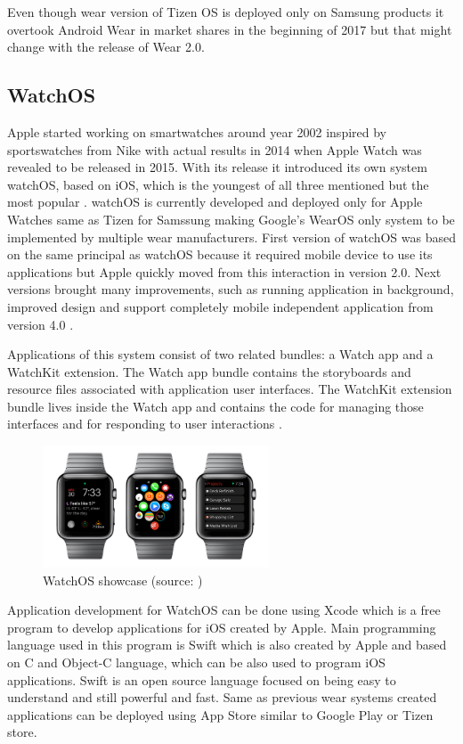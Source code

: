 Even though wear version of Tizen OS is deployed only on Samsung products it overtook Android Wear in market shares in the beginning of 2017 but that might change with the release of Wear 2.0. 

\subsection{WatchOS}\label{sec:WatchOS}
Apple started working on smartwatches around year 2002 inspired by sportswatches from Nike with actual results in 2014 when Apple Watch was revealed to be released in 2015. With its release it introduced its own system watchOS, based on iOS, which is the youngest of all three mentioned but the most popular \cite{ATOHAWWC}. watchOS is currently developed and deployed only for Apple Watches same as Tizen for Samssung making Google's WearOS only system to be implemented by multiple wear manufacturers. First version of watchOS was based on the same principal as watchOS because it required mobile device to use its applications but Apple quickly moved from this interaction in version 2.0. Next versions brought many improvements, such as running application in background, improved design and support completely mobile independent application from version 4.0 \cite{WOS9To5MAC}.

Applications of this system consist of two related bundles: a Watch app and a WatchKit extension. The Watch app bundle contains the storyboards and resource files associated with application user interfaces. The WatchKit extension bundle lives inside the Watch app and contains the code for managing those interfaces and for responding to user interactions \cite{AppleDev}.

\begin{figure}[H]
	\begin{centering}
		\includegraphics[width=0.6\textwidth]{img/apple_watchOs}
		\par\end{centering}
	\caption{WatchOS showcase (source: \cite{HTFAIAAW})\label{fig:WatchOS}}
	\label{fig06c04}
\end{figure}

Application development for WatchOS can be done using Xcode which is a free program to develop applications for iOS created by Apple. Main programming language used in this program is Swift which is also created by Apple and based on C and Object-C language, which can be also used to program iOS applications. Swift is an open source language focused on being easy to understand and still powerful and fast. Same as previous wear systems created applications can be deployed using App Store similar to Google Play or Tizen store.